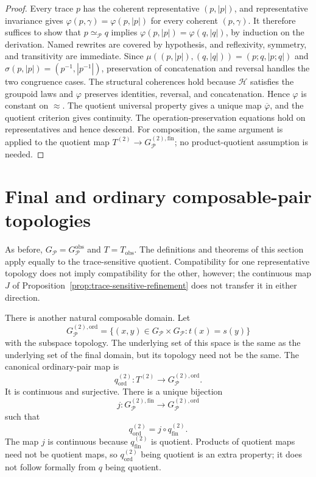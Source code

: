 \documentclass[10pt,reqno]{amsart}
\theoremstyle{definition}
\theoremstyle{plain}
\theoremstyle{remark}
\newcommand{\RwEq}{\mathrel{\simeq_{\!\mathcal P}}}
\newcommand{\Fin}{\mathrm{fin}}
\newcommand{\Ord}{\mathrm{ord}}
\begin{document}
\begin{proof}
Every trace $p$ has the coherent representative $(p,|p|)$, and representative
invariance gives $\varphi(p,\gamma)=\varphi(p,|p|)$ for every coherent
$(p,\gamma)$.  It therefore suffices to show that $p\RwEq q$ implies
$\varphi(p,|p|)=\varphi(q,|q|)$, by induction on the derivation.  Named
rewrites are covered by hypothesis, and reflexivity, symmetry, and
transitivity are immediate.  Since
$\mu((p,|p|),(q,|q|))=(p;q,|p;q|)$ and $\sigma(p,|p|)=(p^{-1},|p^{-1}|)$,
preservation of concatenation and reversal handles the two congruence cases.
The structural coherences hold because $\mathcal H$ satisfies the groupoid
laws and $\varphi$ preserves identities, reversal, and concatenation.  Hence
$\varphi$ is constant on $\approx$.  The quotient universal property gives a unique map
$\overline{\varphi}$, and the quotient criterion gives continuity.  The
operation-preservation equations hold on representatives and hence descend.
For composition, the same argument is applied to the quotient map
$T^{(2)}\to G_{\mathcal P}^{(2),\Fin}$; no product-quotient assumption is
needed.
\end{proof}

\section{Final and ordinary composable-pair topologies}
\label{sec:final-ordinary}

As before, $G_{\mathcal P}=G_{\mathcal P}^{\mathrm{obs}}$ and
$T=T_{\mathrm{obs}}$.  The definitions and theorems of this section apply
equally to the trace-sensitive quotient.  Compatibility for one
representative topology does not imply compatibility for the other, however;
the continuous map $J$ of Proposition~\ref{prop:trace-sensitive-refinement}
does not transfer it in either direction.

There is another natural composable domain.  Let
\[
  G_{\mathcal P}^{(2),\Ord}
  =\{(x,y)\in G_{\mathcal P}\times G_{\mathcal P}:t(x)=s(y)\}
\]
with the subspace topology.  The underlying set of this space is the same as
the underlying set of the final domain, but its topology need not be the same.
The canonical ordinary-pair map is
\[
  q_{\Ord}^{(2)}:T^{(2)}\longrightarrow G_{\mathcal P}^{(2),\Ord}.
\]
It is continuous and surjective.  There is a unique bijection
\[
  j:G_{\mathcal P}^{(2),\Fin}\longrightarrow G_{\mathcal P}^{(2),\Ord}
\]
such that
\[
  q_{\Ord}^{(2)}=j\circ q_{\Fin}^{(2)}.
\]
The map $j$ is continuous because $q_{\Fin}^{(2)}$ is quotient.  Products of
quotient maps need not be quotient maps, so $q_{\Ord}^{(2)}$ being quotient is
an extra property; it does not follow formally from $q$ being quotient.
\end{document}
